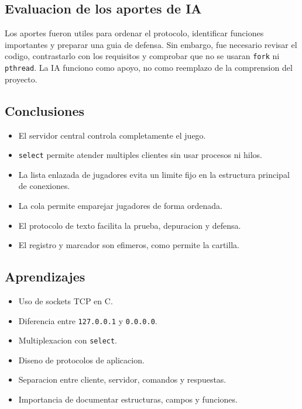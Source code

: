 \documentclass[12pt,a4paper]{article}
\begin{document}
\subsection{Evaluacion de los aportes de IA}

Los aportes fueron utiles para ordenar el protocolo, identificar funciones
importantes y preparar una guia de defensa. Sin embargo, fue necesario revisar
el codigo, contrastarlo con los requisitos y comprobar que no se usaran
\texttt{fork} ni \texttt{pthread}. La IA funciono como apoyo, no como reemplazo
de la comprension del proyecto.

\subsection{Conclusiones}

\begin{itemize}
    \item El servidor central controla completamente el juego.
    \item \texttt{select} permite atender multiples clientes sin usar procesos
    ni hilos.
    \item La lista enlazada de jugadores evita un limite fijo en la estructura
    principal de conexiones.
    \item La cola permite emparejar jugadores de forma ordenada.
    \item El protocolo de texto facilita la prueba, depuracion y defensa.
    \item El registro y marcador son efimeros, como permite la cartilla.
\end{itemize}

\subsection{Aprendizajes}

\begin{itemize}
    \item Uso de sockets TCP en C.
    \item Diferencia entre \texttt{127.0.0.1} y \texttt{0.0.0.0}.
    \item Multiplexacion con \texttt{select}.
    \item Diseno de protocolos de aplicacion.
    \item Separacion entre cliente, servidor, comandos y respuestas.
    \item Importancia de documentar estructuras, campos y funciones.
\end{itemize}
\end{document}
